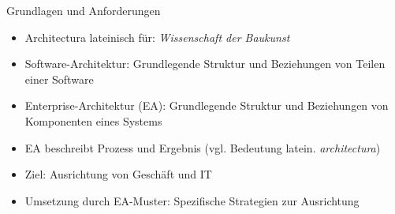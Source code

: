 \begin{frame}{Grundlagen und Anforderungen}
    \begin{itemize}
        \item Architectura lateinisch für: \textit{Wissenschaft der Baukunst}
        \item Software-Architektur: Grundlegende Struktur und Beziehungen von Teilen einer Software \cite{eaprinciples}
        \item Enterprise-Architektur (EA): Grundlegende Struktur und Beziehungen von Komponenten eines Systems
        \item EA beschreibt Prozess und Ergebnis (vgl. Bedeutung latein. \textit{architectura})
        \item Ziel: Ausrichtung von Geschäft und IT
        \item Umsetzung durch EA-Muster: Spezifische Strategien zur Ausrichtung
    \end{itemize}
\end{frame}
